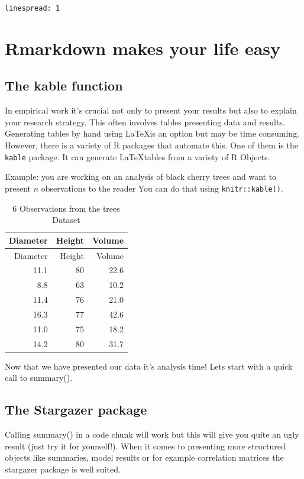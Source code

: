\documentclass[11pt,a4paper]{article}
\begin{document}
\texttt{linespread:\ 1}

\hypertarget{rmarkdown-makes-your-life-easy}{%
\section{Rmarkdown makes your life
easy}\label{rmarkdown-makes-your-life-easy}}

\hypertarget{the-kable-function}{%
\subsection{The kable function}\label{the-kable-function}}

In empirical work it's crucial not only to present your results but also
to explain your research strategy. This often involves tables presenting
data and results. Generating tables by hand using \LaTeX is an option
but may be time consuming. However, there is a variety of R packages
that automate this. One of them is the \texttt{kable} package. It can
generate \LaTeX tables from a variety of R Objects.

Example: you are working on an analysis of black cherry trees and want
to present \(n\) observations to the reader You can do that using
\texttt{knitr::kable()}.

\begin{longtable}[]{@{}rrr@{}}
\caption{6 Observations from the trees Dataset}\tabularnewline
\toprule
Diameter & Height & Volume\tabularnewline
\midrule
\endfirsthead
\toprule
Diameter & Height & Volume\tabularnewline
\midrule
\endhead
11.1 & 80 & 22.6\tabularnewline
8.8 & 63 & 10.2\tabularnewline
11.4 & 76 & 21.0\tabularnewline
16.3 & 77 & 42.6\tabularnewline
11.0 & 75 & 18.2\tabularnewline
14.2 & 80 & 31.7\tabularnewline
\bottomrule
\end{longtable}

Now that we have presented our data it's analysis time! Lets start with
a quick call to summary().

\hypertarget{the-stargazer-package}{%
\subsection{The Stargazer package}\label{the-stargazer-package}}

Calling summary() in a code chunk will work but this will give you quite
an ugly result (just try it for yourself!). When it comes to presenting
more structured objects like summaries, model results or for example
correlation matrices the stargazer package is well suited.
\end{document}
